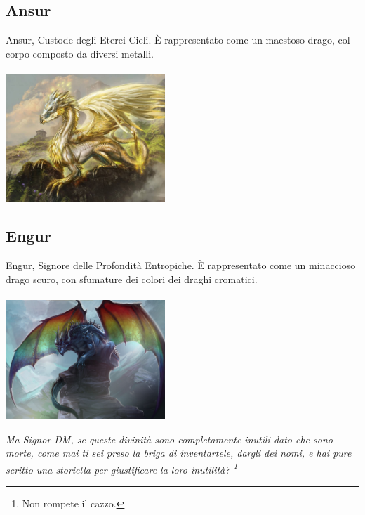 \documentclass[10pt, a4paper]{report}
\begin{document}
\begin{multicols}{2}
\newpage
\subsection*{Ansur}
Ansur, Custode degli Eterei Cieli. È rappresentato come un maestoso drago, col corpo composto da diversi metalli.\\
\\
\includegraphics[width=6cm]{gizzard.jpg}

\subsection*{Engur}
Engur, Signore delle Profondità Entropiche. È rappresentato come un minaccioso drago scuro, con sfumature dei colori dei draghi cromatici.\\
\\
\includegraphics[width=6cm]{engur.jpg}

\vspace*{1cm}

\end{multicols}
\begin{tiny}
	\textsl{Ma Signor DM, se queste divinità sono completamente inutili dato che sono morte, come mai ti sei preso la briga di inventartele, dargli dei nomi, e hai pure scritto una storiella per giustificare la loro inutilità? \footnote{Non rompete il cazzo.}}\\
\end{tiny}
\end{document}
